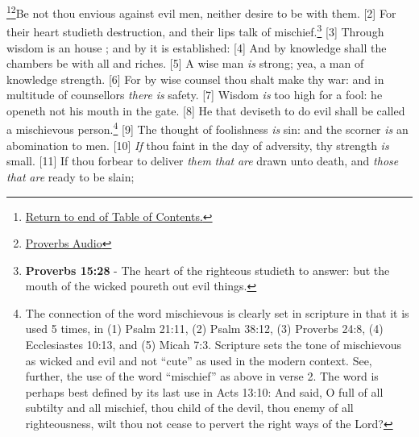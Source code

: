 \footnote{\textcolor[cmyk]{0.99998,1,0,0}{\hyperlink{TOC}{Return to end of Table of Contents.}}}\footnote{\href{https://www.audioverse.org/english/audiobibles/books/ENGKJV/O/Prov/1}{\textcolor[cmyk]{0.99998,1,0,0}{Proverbs Audio}}}\textcolor[cmyk]{0.99998,1,0,0}{Be not thou envious against evil men, neither desire to be with them.}
[2] \textcolor[cmyk]{0.99998,1,0,0}{For their heart studieth destruction, and their lips talk of mischief.}\footnote{\textbf{Proverbs 15:28} - The heart of the righteous studieth to answer: but the mouth of the wicked poureth out evil things.}
[3] \textcolor[cmyk]{0.99998,1,0,0}{Through wisdom is an house ; and by  it is established:}
[4] \textcolor[cmyk]{0.99998,1,0,0}{And by knowledge shall the chambers be  with all  and  riches.}
[5] \textcolor[cmyk]{0.99998,1,0,0}{A wise man \emph{is} strong; yea, a man of knowledge  strength.}
[6] \textcolor[cmyk]{0.99998,1,0,0}{For by wise counsel thou shalt make thy war: and in multitude of counsellors \emph{there} \emph{is} safety.}
[7] \textcolor[cmyk]{0.99998,1,0,0}{Wisdom \emph{is} too high for a fool: he openeth not his mouth in the gate.}
[8] \textcolor[cmyk]{0.99998,1,0,0}{He that deviseth to do evil shall be called a mischievous person.}\footnote{The connection of the word mischievous is clearly set in scripture in that it is used 5 times, in (1) Psalm 21:11, (2) Psalm 38:12, (3) Proverbs 24:8, (4) Ecclesiastes 10:13, and (5) Micah 7:3. Scripture sets the tone of mischievous as wicked and evil and not ``cute'' as used in the modern context. See, further, the use of the word ``mischief'' as above in verse 2. The word is perhaps best defined by its last use in Acts 13:10: And said, O full of all subtilty and all mischief, thou child of the devil, thou enemy of all righteousness, wilt thou not cease to pervert the right ways of the Lord?}
[9] \textcolor[cmyk]{0.99998,1,0,0}{The thought of foolishness \emph{is} sin: and the scorner \emph{is} an abomination to men.}
[10] \textcolor[cmyk]{0.99998,1,0,0}{\emph{If} thou faint in the day of adversity, thy strength \emph{is} small.}
[11] \textcolor[cmyk]{0.99998,1,0,0}{If thou forbear to deliver \emph{them} \emph{that} \emph{are} drawn unto death, and \emph{those} \emph{that} \emph{are} ready to be slain;}
